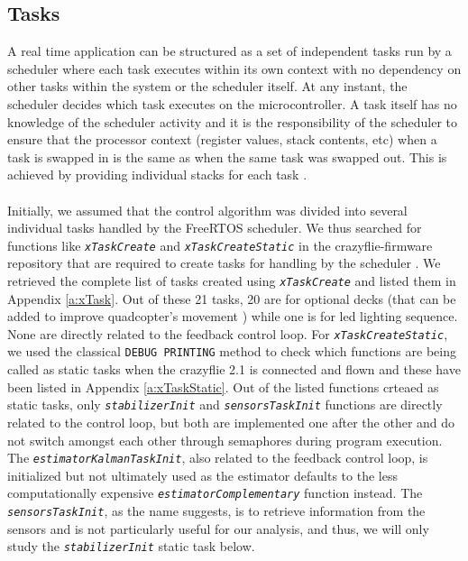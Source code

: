 \documentclass[10pt, a4paper]{article}
\newcommand{\textFunc}[1]{\texttt{\textit{#1}}}
\newcommand{\textDef}[1]{\texttt{#1}}
\newcommand{\app}[1]{Appendix \ref{#1}}
\begin{document}
    \subsection{Tasks}
    A real time application can be structured as a set of independent tasks run by a scheduler where each task executes within its own context with no dependency on other tasks within the system or the scheduler itself. At any instant, the scheduler decides which task executes on the microcontroller. A task itself has no knowledge of the scheduler activity and it is the responsibility of the scheduler to ensure that the processor context (register values, stack contents, etc) when a task is swapped in is the same as when the same task was swapped out. This is achieved by providing individual stacks for each task \cite{freeRTOS}.
    \\ \\     
    Initially, we assumed that the control algorithm was divided into several individual tasks handled by the FreeRTOS scheduler. We thus searched for functions like \textFunc{xTaskCreate} and \textFunc{xTaskCreateStatic} in the crazyflie-firmware repository \cite{firmware} that are required to create tasks for handling by the scheduler \cite{xTask}. We retrieved the complete list of tasks created using \textFunc{xTaskCreate} and listed them in \app{a:xTask}. Out of these 21 tasks, 20 are for optional decks (that can be added to improve quadcopter's movement \cite{Decks}) while one is for led lighting sequence. None are directly related to the feedback control loop. For \textFunc{xTaskCreateStatic}, we used the classical \textDef{DEBUG PRINTING} method to check which functions are being called as static tasks when the crazyflie 2.1 is connected and flown and these have been listed in \app{a:xTaskStatic}. Out of the listed functions crteaed as static tasks, only \textFunc{stabilizerInit} and \textFunc{sensorsTaskInit} functions are directly related to the control loop, but both are implemented one after the other and do not switch amongst each other through semaphores during program execution. The \textFunc{estimatorKalmanTaskInit}, also related to the feedback control loop, is initialized but not ultimately used as the estimator defaults to the less computationally expensive \textFunc{estimatorComplementary} function instead. The \textFunc{sensorsTaskInit}, as the name suggests, is to retrieve information from the sensors and is not particularly useful for our analysis, and thus, we will only study the \textFunc{stabilizerInit} static task below.
    
\end{document}
